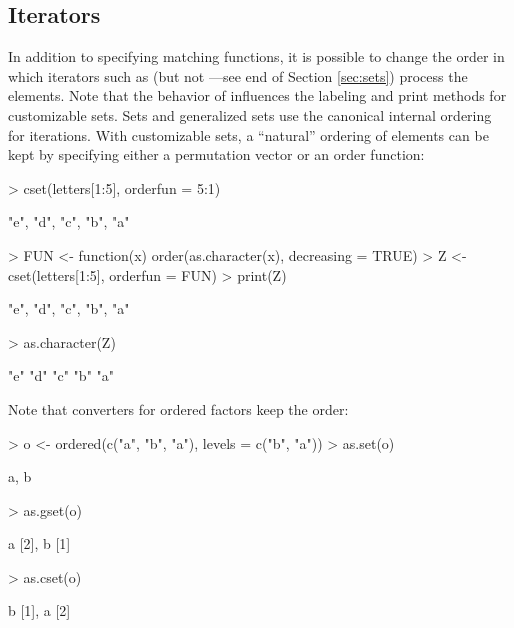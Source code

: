 \documentclass[article]{jss}
\newcommand{\codefun}[1]{\code{#1()}}
\begin{document}
\subsection{Iterators}

In addition to specifying matching functions, it is possible to
change the order in which
iterators such as \codefun{as.list} (but not \codefun{for}---see end
of Section \ref{sec:sets})
process the elements. Note that the behavior of \codefun{as.list}
influences the labeling and print methods for
customizable sets. Sets and generalized sets
use the canonical internal ordering for iterations. With
customizable sets, a ``natural'' ordering of elements can be kept
by specifying either a permutation vector or an order function:

\begin{Schunk}
\begin{Sinput}
> cset(letters[1:5], orderfun = 5:1)
\end{Sinput}
\begin{Soutput}
{"e", "d", "c", "b", "a"}
\end{Soutput}
\begin{Sinput}
> FUN <- function(x) order(as.character(x), decreasing = TRUE)
> Z <- cset(letters[1:5], orderfun = FUN)
> print(Z)
\end{Sinput}
\begin{Soutput}
{"e", "d", "c", "b", "a"}
\end{Soutput}
\begin{Sinput}
> as.character(Z)
\end{Sinput}
\begin{Soutput}
[1] "e" "d" "c" "b" "a"
\end{Soutput}
\end{Schunk}
Note that converters for ordered factors keep the order:
\begin{Schunk}
\begin{Sinput}
> o <- ordered(c("a", "b", "a"), levels = c("b", "a"))
> as.set(o)
\end{Sinput}
\begin{Soutput}
{a, b}
\end{Soutput}
\begin{Sinput}
> as.gset(o)
\end{Sinput}
\begin{Soutput}
{a [2], b [1]}
\end{Soutput}
\begin{Sinput}
> as.cset(o)
\end{Sinput}
\begin{Soutput}
{b [1], a [2]}
\end{Soutput}
\end{Schunk}
\end{document}
